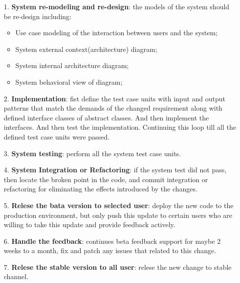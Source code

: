 \documentclass[conference]{IEEEtran}
\begin{document}
\begin{itemize}
	\item [1.] \textbf{System re-modeling and re-design}: the models of the system should be re-design including:
	      \begin{itemize}
		      \item Use case modeling of the interaction between users and the system;
		      \item System external context(architecture) diagram;
		      \item System internal architecture diagram;
		      \item System behavioral view of diagram;
	      \end{itemize}
	\item [2.] \textbf{Implementation}: fist define the test case units with input and output patterns
	      that match the demands of the changed requirement along with defined interface classes of abstract classes.
	      And then implement the interfaces. And then test the implementation.
	      Continuing this loop till all the defined test case units were passed.
	\item [3.] \textbf{System testing}: perform all the system test case units.
	\item [4.] \textbf{System Integration or Refactoring}: if the system test did not pass, then locate the broken point in the code,
	      and commit integration or refactoring for eliminating the effects introduced by the changes.
	\item [5.] \textbf{Relese the bata version to selected user}: deploy the new code to the production environment,
	      but only push this update to certain users who are willing to take this update and provide feedback actively.
	\item [6.] \textbf{Handle the feedback}: continues beta feedback support for maybe 2 weeks to a month, fix and patch any issues
	      that related to this change.
	\item [7.] \textbf{Relese the stable version to all user}: relese the new change to stable channel.

\end{itemize}
\end{document}
